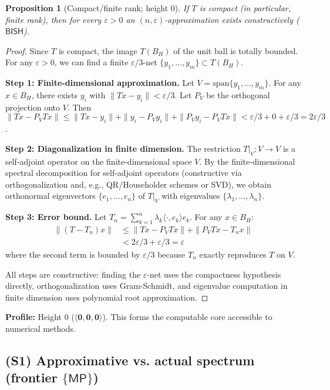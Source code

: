 \documentclass[11pt]{article}
\newcommand{\MP}{\mathsf{MP}}
\newcommand{\hzero}{\mathbf{0}}
\newcommand{\allzero}{\langle \hzero,\hzero,\hzero\rangle}
\newcommand{\leanok}{\text{\tiny [✓ Lean]}}
\theoremstyle{plain}
\newtheorem{proposition}[theorem]{Proposition}
\theoremstyle{definition}
\theoremstyle{remark}
\newcommand{\BISH}{\mathsf{BISH}}
\begin{document}
\begin{proposition}[Compact/finite rank; height $0$] \leanok
If $T$ is compact (in particular, finite rank), then for every $\varepsilon>0$ an $(n,\varepsilon)$-approximation exists constructively ($\BISH$).
\end{proposition}

\begin{proof}
Since $T$ is compact, the image $T(B_H)$ of the unit ball is totally bounded. For any $\varepsilon > 0$, we can find a finite $\varepsilon/3$-net $\{y_1, \ldots, y_m\} \subset T(B_H)$.

\textbf{Step 1: Finite-dimensional approximation.}
Let $V = \text{span}\{y_1, \ldots, y_m\}$. For any $x \in B_H$, there exists $y_i$ with $\|Tx - y_i\| < \varepsilon/3$. 
Let $P_V$ be the orthogonal projection onto $V$. Then $\|Tx - P_V Tx\| \leq \|Tx - y_i\| + \|y_i - P_V y_i\| + \|P_V y_i - P_V Tx\| < \varepsilon/3 + 0 + \varepsilon/3 = 2\varepsilon/3$.

\textbf{Step 2: Diagonalization in finite dimension.}
The restriction $T|_V: V \to V$ is a self-adjoint operator on the finite-dimensional space $V$. 
By the finite-dimensional spectral decomposition for self-adjoint operators (constructive via orthogonalization and, e.g., QR/Householder schemes or SVD), 
we obtain orthonormal eigenvectors $\{e_1, \ldots, e_n\}$ of $T|_V$ with eigenvalues $\{\lambda_1, \ldots, \lambda_n\}$.

\textbf{Step 3: Error bound.}
Let $T_n = \sum_{k=1}^n \lambda_k \langle \cdot, e_k\rangle e_k$. For any $x \in B_H$:
\begin{align}
\|(T - T_n)x\| &\leq \|Tx - P_V Tx\| + \|P_V Tx - T_n x\| \\
&< 2\varepsilon/3 + \varepsilon/3 = \varepsilon
\end{align}
where the second term is bounded by $\varepsilon/3$ because $T_n$ exactly reproduces $T$ on $V$.

All steps are constructive: finding the $\varepsilon$-net uses the compactness hypothesis directly, orthogonalization uses Gram-Schmidt, and eigenvalue computation in finite dimension uses polynomial root approximation.
\end{proof}

\noindent\textbf{Profile:} Height 0 ($\allzero$). This forms the computable core accessible to numerical methods.

\subsection{(S1) Approximative vs. actual spectrum (frontier $\{\MP\}$)} \leanok
\end{document}
